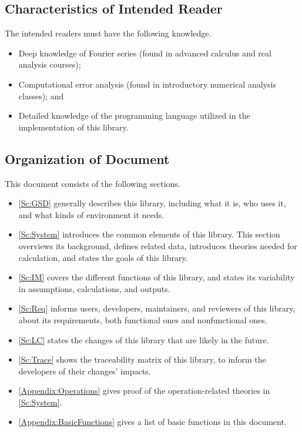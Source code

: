 \documentclass[12pt]{article}
\begin{document}
\subsection{Characteristics of Intended Reader} \label{sec_IntendedReader}

The intended readers must have the following knowledge.
\begin{itemize}
	\item Deep knowledge of Fourier series (found in advanced 
	calculus and real analysis courses);
	\item Computational error analysis (found in introductory numerical 
	analysis classes); and
	\item Detailed knowledge of the programming language utilized 
	in the implementation of this library.	
\end{itemize}

\subsection{Organization of Document}

This document consists of the following sections.
\begin{itemize}
	\item \autoref{Sc:GSD} generally describes this library, including 
	what it is, who uses it, and what kinds of environment it needs.
	\item \autoref{Sc:System} introduces the common elements of this library. 
	This section overviews its background, defines related data, 
	introduces theories needed for calculation, 
	and states the goals of this library.
	\item \autoref{Sc:IM} covers the different functions of this library, 
	and states its variability in assumptions, calculations, and outputs.
	\item \autoref{Sc:Req} informs users, developers, maintainers, 
	and reviewers of this library, about its requirements, 
	both functional ones and nonfunctional ones.
	\item \autoref{Sc:LC} states the changes of this library that are 
	likely in the future.
	\item \autoref{Sc:Trace} shows the traceability matrix of this library, 
	to inform the developers of their changes' impacts.
	\item \autoref{Appendix:Operations} gives proof of the 
	operation-related theories in \autoref{Sc:System}.
	\item \autoref{Appendix:BasicFunctions} gives a list of basic functions in this document.   
\end{itemize}
\end{document}
